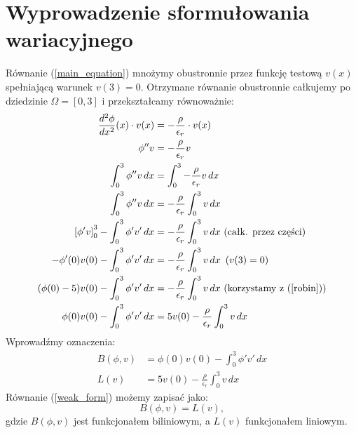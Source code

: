 \documentclass[a4paper,12pt]{article}
\begin{document}
    \section{Wyprowadzenie sformułowania wariacyjnego}
    Równanie (\ref{main_equation}) mnożymy obustronnie przez funkcję testową \(v(x)\) spełniającą warunek \(v(3) = 0\).
    Otrzymane równanie obustronnie całkujemy po dziedzinie \(\Omega = [0,3]\) i przekształcamy równoważnie:
    \begin{align}
        \frac{d^2\phi}{dx^2}(x) \cdot v(x) &= -\frac{\rho}{\epsilon_r} \cdot v(x) \nonumber \\
        \phi'' v &= -\frac{\rho}{\epsilon_r} v \nonumber \\
        \int_{0}^{3} \phi'' v\,dx &= \int_{0}^{3} -\frac{\rho}{\epsilon_r} v\,dx \nonumber \\
        \int_{0}^{3} \phi'' v\,dx &= -\frac{\rho}{\epsilon_r} \int_{0}^{3} v\,dx \nonumber \\
        \left[\phi' v\right]_{0}^{3} - \int_{0}^{3} \phi' v'\,dx &= -\frac{\rho}{\epsilon_r} \int_{0}^{3} v\,dx \text{ (całk. przez części)} \nonumber \\
        -\phi'(0) v(0) - \int_{0}^{3} \phi' v'\,dx &= -\frac{\rho}{\epsilon_r} \int_{0}^{3} v\,dx\ \left(v(3) = 0\right) \nonumber \\
        (\phi(0)-5) v(0) - \int_{0}^{3} \phi' v'\,dx &= -\frac{\rho}{\epsilon_r} \int_{0}^{3} v\,dx \text{ (korzystamy z (\ref{robin}))} \nonumber \\
        \phi(0) v(0) - \int_{0}^{3} \phi' v'\,dx &= 5v(0) -\frac{\rho}{\epsilon_r} \int_{0}^{3} v\,dx \label{weak_form}
    \end{align}
    Wprowadźmy oznaczenia:
    \begin{align}
        B(\phi, v) &= \phi(0) v(0) - \int_{0}^{3} \phi' v'\,dx \label{b_def} \\
        L(v) &= 5v(0) -\frac{\rho}{\epsilon_r} \int_{0}^{3} v\,dx \label{l_def}
    \end{align}
    Równanie (\ref{weak_form}) możemy zapisać jako:
    \begin{equation}
        B(\phi, v) = L(v), \label{b_eq_l}
    \end{equation}
    gdzie \(B(\phi, v)\) jest funkcjonałem biliniowym, a \(L(v)\) funkcjonałem liniowym.
\end{document}
